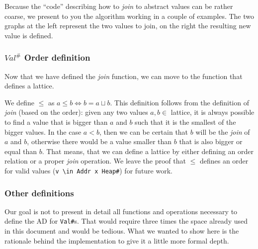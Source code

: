 Because the \enquote{code} describing how to \emph{join} to abstract
values can be rather coarse, we present to you the algorithm working in
a couple of examples. The two graphs at the left represent the two
values to join, on the right the resulting new value is defined.



\subsubsection*{\(Val^\#\) Order definition}

Now that we have defined the \emph{join} function, we can move to the
function that defines a lattice.

We define \(\le{}\) as \(a \le b \iff b = a \sqcup b\). This definition
follows from the definition of \emph{join} (based on the order): given
any two values \(a,b \in\) lattice, it is always possible to find a
value that is bigger than \(a\) and \(b\) such that it is the smallest
of the bigger values. In the case \(a < b\), then we can be certain that
\(b\) will be the \emph{join} of \(a\) and \(b\), otherwise there would
be a value smaller than \(b\) that is also bigger or equal than \(b\).
That means, that we can define a lattice by either defining an order
relation or a proper \emph{join} operation. We leave the proof that
\(\le{}\) defines an order for valid values
(\texttt{v\ \textbackslash{}in\ Addr\ x\ Heap\#}) for future work.

\subsubsection*{Other definitions}

Our goal is not to present in detail all functions and operations
necessary to define the AD for \texttt{Val\#}s. That would require three
times the space already used in this document and would be tedious.
What we wanted to show here is the rationale behind the implementation to
give it a little more formal depth.

